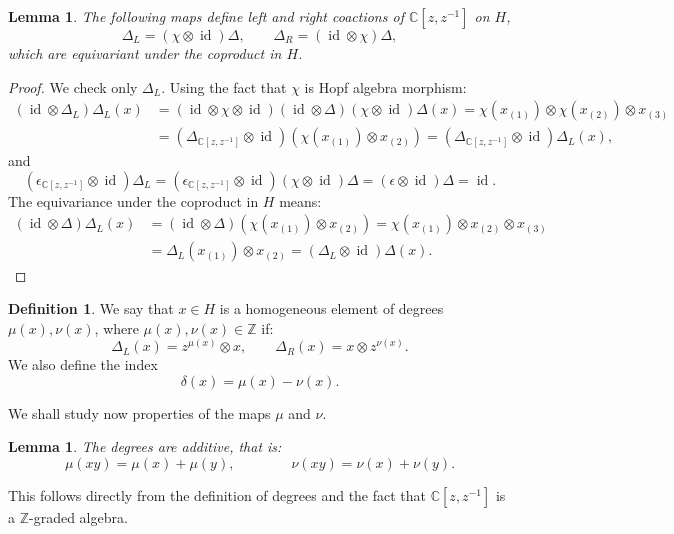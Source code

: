 \documentclass[12pt]{amsart}
\newtheorem{lem}[thm]{Lemma}
\theoremstyle{definition}
\newtheorem{defn}[thm]{Definition}
\numberwithin{equation}{section}
\renewcommand{\a}{\chi}             %
\newcommand{\C}{\mathbb{C}}         %
\newcommand{\Z}{\mathbb{Z}}         %
\newcommand{\cop}{\Delta}           %
\newcommand{\ox}{\otimes}           %
\DeclareMathOperator{\id}{id}       %
\begin{document}
\begin{lem}
The following maps define left and right coactions of $\C[z,z^{-1}]$ on $H$, 
$$ \cop_L = (\a \ox \id) \cop, \quad \quad  \cop_R = (\id \ox \a) \cop, $$
which are equivariant under the coproduct in $H$.
\end{lem}
\begin{proof}
We check only $\Delta_L$. Using the fact that $\a$ is Hopf algebra morphism:
$$ 
\begin{aligned}
(\id \otimes \Delta_L) \Delta_L(x) & = (\id \ox \a \ox \id) (\id \ox \Delta) (\a \ox \id) \Delta(x)  
= \a(x_{(1)}) \ox \a(x_{(2)}) \ox x_{(3)} \\
& = \left(\Delta_{\C[z,z^{-1}]}\ox \id\right) (\a(x_{(1)})  \ox x_{(2)} ) =
 ( \Delta_{\C[z,z^{-1}]} \ox \id ) \Delta_L(x),
\end{aligned}
$$
and
$$ (\epsilon_{\C[z,z^{-1}]} \ox \id) \cop_L = (\epsilon_{\C[z,z^{-1}]} \ox \id) (\a \ox \id) \cop
= (\epsilon \ox \id) \cop = \id. $$
The equivariance under the coproduct in $H$ means:
$$ 
\begin{aligned}
(\id \otimes \Delta) \Delta_L(x) & = (\id \otimes \Delta) (\a(x_{(1)}) \ox x_{(2)}) =
\a(x_{(1)}) \ox x_{(2)} \ox x_{(3)} \\
& = \Delta_L(x_{(1)}) \ox x_{(2)}   = ( \Delta_L \ox \id ) \Delta (x).
\end{aligned}
$$
\end{proof}
\begin{defn}
We say that $x \in H$ is a homogeneous element of degrees 
$\mu(x),\nu(x)$, where $\mu(x), \nu(x) \in \Z$ if:
$$ \cop_L(x) = z^{\mu(x)} \ox x, \quad \quad \cop_R(x) = x \ox z^{\nu(x)}. $$
We also define the index 
$$\delta(x)=\mu(x)-\nu(x).$$
\end{defn}

We shall study now properties of the maps $\mu$ and $\nu$. 

\begin{lem}\label{add}
The degrees are additive, that is:
$$ \mu(xy) = \mu(x)+\mu(y), \qquad \qquad \nu(xy) = \nu(x)+\nu(y). $$
\end{lem}
This follows directly from the definition of degrees and the fact that 
$\C[z,z^{-1}]$ is a $\Z$-graded algebra.


\end{document}
